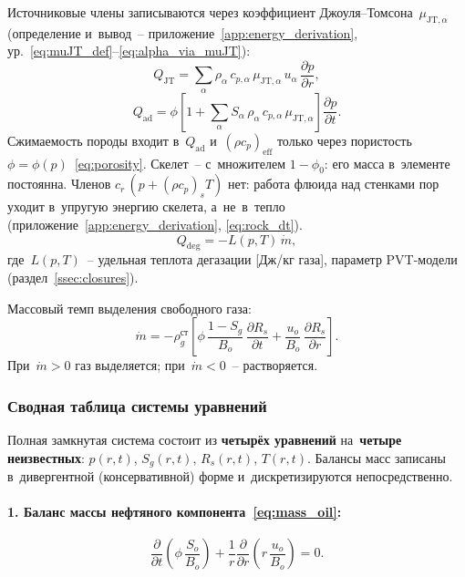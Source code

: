\documentclass[12pt,a4paper]{article}
\newcommand{\divr}[1]{\frac{1}{r}\frac{\partial}{\partial r}\!\left(r\,#1\right)}
\newcommand{\pdt}[1]{\frac{\partial #1}{\partial t}}
\newcommand{\pdr}[1]{\frac{\partial #1}{\partial r}}
\newcommand{\mdot}{\dot{m}}
\newcommand{\rhocpeff}{(\rho c_p)_{\mathrm{eff}}}
\newcommand{\QJT}{Q_{\mathrm{JT}}}
\newcommand{\Qad}{Q_{\mathrm{ad}}}
\newcommand{\Qdeg}{Q_{\mathrm{deg}}}
\begin{document}
Источниковые члены записываются через коэффициент
Джоуля--Томсона~$\mu_{\mathrm{JT},\alpha}$
(определение и~вывод~-- приложение~\ref{app:energy_derivation},
ур.~\eqref{eq:muJT_def}--\eqref{eq:alpha_via_muJT}):
\begin{equation}\label{eq:main_QJT_muJT}
  \boxed{
    \QJT
    = \sum_\alpha \rho_\alpha\,c_{p,\alpha}\,
      \mu_{\mathrm{JT},\alpha}\,u_\alpha\,\pdr{p},
  }
\end{equation}
\begin{equation}\label{eq:main_Qad_muJT}
  \boxed{
    \Qad
    = \phi\!\left[ 1+
      \sum_\alpha S_\alpha\,
        \rho_\alpha\,c_{p,\alpha}\,\mu_{\mathrm{JT},\alpha}
    \right]\pdt{p}.
  }
\end{equation}
Сжимаемость породы входит в~$\Qad$ и~$\rhocpeff$ только через
пористость~$\phi = \phi(p)$~\eqref{eq:porosity}. Скелет~-- с~множителем
$1 - \phi_0$: его масса в~элементе постоянна. Членов
$c_r\,(p + (\rho c_p)_s T)$ нет: работа флюида над стенками пор уходит
в~упругую энергию скелета, а~не~в~тепло
(приложение~\ref{app:energy_derivation}, \eqref{eq:rock_dt}).
\begin{equation}\label{eq:main_Qdeg}
\Qdeg = - L(p,T)\,\mdot,
\end{equation}
где~$L(p,T)$~-- удельная теплота дегазации [Дж/кг газа],
параметр PVT-модели (раздел~\ref{ssec:closures}).

Массовый темп выделения свободного газа:
\begin{equation}\label{eq:main_mdot}
  \boxed{
    \mdot = -\rho_g^{\text{ст}}\!\left[
      \phi\,\frac{1-S_g}{B_o}\,\pdt{R_s}
      + \frac{u_o}{B_o}\,\pdr{R_s}
    \right].
  }
\end{equation}
При~$\mdot > 0$ газ выделяется; при~$\mdot < 0$~-- растворяется.

\subsubsection{Сводная таблица системы уравнений}

Полная замкнутая система состоит из \textbf{четырёх уравнений}
на~\textbf{четыре неизвестных}: $p(r,t)$, $S_g(r,t)$, $R_s(r,t)$,
$T(r,t)$. Балансы масс записаны в~дивергентной (консервативной)
форме и~дискретизируются непосредственно.

\paragraph{1. Баланс массы нефтяного компонента~\eqref{eq:mass_oil}:}
\[
  \pdt{}\!\left(\phi\,\frac{S_o}{B_o}\right)
  + \divr{\frac{u_o}{B_o}} = 0.
\]
\end{document}
